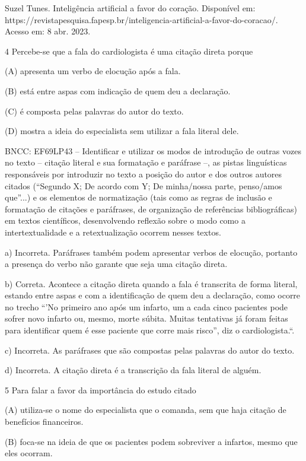 \begin{itemize}
\begin{itemize}
{\begin{itemize}
\begin{itemize}
\begin{escolha}
\begin{escolha}
\begin{escolha}
\begin{escolha}
\begin{escolha}
Suzel Tunes. Inteligência artificial a favor do coração. Disponível em:
https://revistapesquisa.fapesp.br/inteligencia-artificial-a-favor-do-coracao/.
Acesso em: 8 abr. 2023.

\num {4} Percebe-se que a fala do cardiologista é uma citação direta
porque

(A) apresenta um verbo de elocução após a fala.

(B) está entre aspas com indicação de quem deu a declaração.

(C) é composta pelas palavras do autor do texto.

(D) mostra a ideia do especialista sem utilizar a fala literal dele.

BNCC: EF69LP43 -- Identificar e utilizar os modos de introdução de
outras vozes no texto -- citação literal e sua formatação e paráfrase
--, as pistas linguísticas responsáveis por introduzir no texto a
posição do autor e dos outros autores citados (``Segundo X; De acordo
com Y; De minha/nossa parte, penso/amos que''...) e os elementos de
normatização (tais como as regras de inclusão e formatação de citações e
paráfrases, de organização de referências bibliográficas) em textos
científicos, desenvolvendo reflexão sobre o modo como a
intertextualidade e a retextualização ocorrem nesses textos.

a) Incorreta. Paráfrases também podem apresentar verbos de elocução,
portanto a presença do verbo não garante que seja uma citação direta.

b) Correta. Acontece a citação direta quando a fala é transcrita de
forma literal, estando entre aspas e com a identificação de quem deu a
declaração, como ocorre no trecho ``'No primeiro ano após um infarto, um
a cada cinco pacientes pode sofrer novo infarto ou, mesmo, morte súbita.
Muitas tentativas já foram feitas para identificar quem é esse paciente
que corre mais risco'', diz o cardiologista.``.

c) Incorreta. As paráfrases que são compostas pelas palavras do autor do
texto.

d) Incorreta. A citação direta é a transcrição da fala literal de
alguém.

\num {5} Para falar a favor da importância do estudo citado

(A) utiliza-se o nome do especialista que o comanda, sem que haja
citação de benefícios financeiros.

(B) foca-se na ideia de que os pacientes podem sobreviver a infartos,
mesmo que eles ocorram.


\end{escolha}
\end{escolha}
\end{escolha}
\end{escolha}
\end{escolha}
\end{itemize}
\end{itemize}}
\end{itemize}
\end{itemize}
